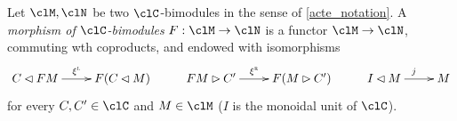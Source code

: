 \begin{definition}\label{moromod}
	Let $\clM,\clN$ be two $\clC$-bimodules in the sense of \ref{acte_notation}. A \emph{morphism of $\clC$-bimodules} $F : \clM \to \clN$ is a functor $\clM\to\clN$, commuting wth coproducts, and endowed with isomorphisms
	\[
		\xymatrix{
		C\lact FM \ar[r]^-{\xi^{\l}} & F(C\lact M) &
		FM\ract C' \ar[r]^-{\xi^{\r}} & F(M\ract C') &
		I\lact M \ar[r]^j & M
		}
	\]
	for every $C,C'\in\clC$ and $M\in\clM$ ($I$ is the monoidal unit of $\clC$).


\end{definition}
